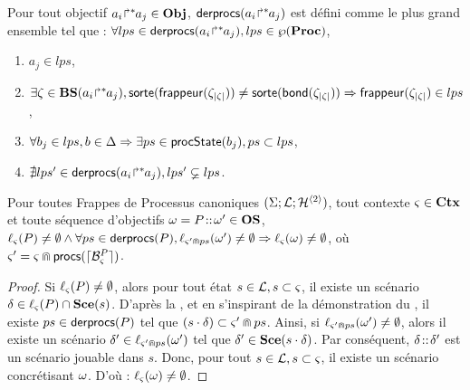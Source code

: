 \begin{definition}[$\derprocs : \Obj \to \powerset(\powerset(\Proc))$]
  Pour tout objectif ${a_i\!\Rsh^*\!\!a_j} \in \mathbf{Obj}$, $\mathsf{derprocs}({a_i\!\Rsh^*\!\!a_j})$
  est défini comme le plus grand ensemble tel que :
  $\forall lps \in \mathsf{derprocs}({a_i\!\Rsh^*\!\!a_j}), lps \in \wp(\mathbf{Proc})$,
  \begin{enumerate}
    \item $a_j \in lps$,
    \item $\exists \zeta \in \mathbf{BS}({a_i\!\Rsh^*\!\!a_j}),
        \mathsf{sorte}(\mathsf{frappeur}(\zeta_{|\zeta|})) \neq \mathsf{sorte}(\mathsf{bond}(\zeta_{|\zeta|}))
        \Rightarrow \mathsf{frappeur}(\zeta_{|\zeta|}) \in lps$,
    \item $\forall b_j \in lps, b \in \Delta \Rightarrow \exists ps \in \mathsf{procState}(b_j), ps \subset lps$,
    \item $\nexists lps'\in \mathsf{derprocs}({a_i\!\Rsh^*\!\!a_j}), lps' \varsubsetneq lps$.
  \end{enumerate}
\end{definition}

\begin{theorem}
  Pour toutes Frappes de Processus canoniques $(\Sigma; \mathcal{L}; \mathcal{H}^{\langle 2 \rangle})$,
  tout contexte $\varsigma \in \mathbf{Ctx}$ et toute séquence d'objectifs $\omega = P \!::\! \omega' \in \mathbf{OS}$,
  $\ell_\varsigma(P) \neq \emptyset \wedge \forall ps \in \mathsf{derprocs}(P),
    \ell_{\varsigma' \Cap ps}(\omega') \neq \emptyset
    \Rightarrow \ell_\varsigma(\omega) \neq \emptyset$,
  où $\varsigma' = \varsigma \Cap \mathsf{procs}(\lceil \mathcal{B}_{\varsigma}^{P}\rceil)$.
\end{theorem}

\begin{proof} %
  Si $\ell_\varsigma(P) \neq \emptyset$, alors pour tout état $s \in \mathcal{L}, s \subset \varsigma$,
  il existe un scénario $\delta \in \ell_\varsigma(P) \cap \mathbf{Sce}(s)$.
  D'après la ,
  et en s'inspirant de la démonstration du ,
  il existe $ps \in \mathsf{derprocs}(P)$ tel que $(s \cdot \delta) \subset \varsigma' \Cap ps$.
  Ainsi, si $\ell_{\varsigma' \Cap ps}(\omega') \neq \emptyset$,
  alors il existe un scénario $\delta' \in \ell_{\varsigma' \Cap ps}(\omega')$ tel que
  $\delta' \in \mathbf{Sce}(s \cdot \delta)$.
  Par conséquent, $\delta \!::\! \delta'$ est un scénario jouable dans $s$.
  Donc, pour tout $s \in \mathcal{L}, s \subset \varsigma$, il existe un scénario concrétisant $\omega$.
  D'où : $\ell_\varsigma(\omega) \neq \emptyset$.
\end{proof}
